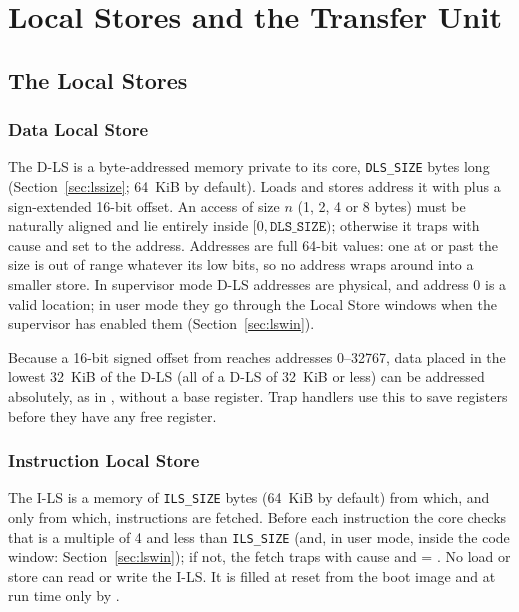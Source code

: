\chapter{Local Stores and the Transfer Unit}\label{ch:memory}

\section{The Local Stores}

\subsection{Data Local Store}
The D-LS is a byte-addressed memory private to its core, \texttt{DLS\_SIZE} bytes long
(Section~\ref{sec:lssize}; 64~KiB by default). Loads and stores address it with  plus a
sign-extended 16-bit offset. An access of size $n$ (1, 2, 4 or 8 bytes) must be naturally aligned and
lie entirely inside $[0, \texttt{DLS\_SIZE})$; otherwise it traps with cause  and
 set to the address. Addresses are full 64-bit values: one at or past the size is out of
range whatever its low bits, so no address wraps around into a smaller store. In supervisor mode
D-LS addresses are physical, and address 0 is a valid location; in user mode they go through the
Local Store windows when the supervisor has enabled them (Section~\ref{sec:lswin}).

Because a 16-bit signed offset from  reaches addresses 0--32767, data placed in the lowest
32~KiB of the D-LS (all of a D-LS of 32~KiB or less) can be addressed absolutely, as in
, without a base register. Trap handlers use this to save registers before
they have any free register.

\subsection{Instruction Local Store}
The I-LS is a memory of \texttt{ILS\_SIZE} bytes (64~KiB by default) from which, and only from which,
instructions are fetched. Before each instruction the core checks that  is a multiple of 4 and
less than \texttt{ILS\_SIZE} (and, in user mode, inside the code window: Section~\ref{sec:lswin});
if not, the fetch traps with cause  and  = . No load or store can read or write the I-LS. It is filled at reset from the boot image and at
run time only by .

